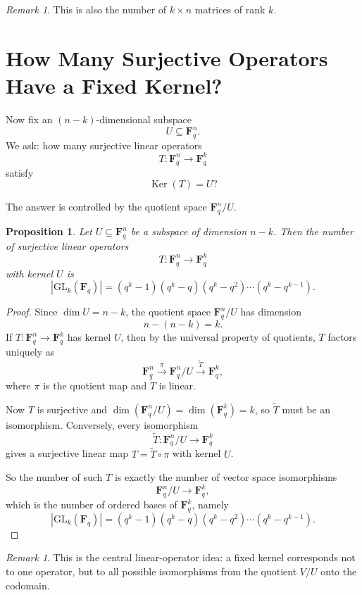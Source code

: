 \documentclass[11pt]{article}
\newtheorem{proposition}[theorem]{Proposition}
\theoremstyle{definition}
\theoremstyle{remark}
\newtheorem{remark}[theorem]{Remark}
\newcommand{\F}{\mathbf{F}}
\newcommand{\GL}{\mathrm{GL}}
\newcommand{\Ker}{\operatorname{Ker}}
\begin{document}
	\begin{remark}
		This is also the number of \(k\times n\) matrices of rank \(k\).
	\end{remark}
	
	\section{How Many Surjective Operators Have a Fixed Kernel?}
	
	Now fix an \((n-k)\)-dimensional subspace
	\[
	U\subseteq \F_q^n.
	\]
	We ask: how many surjective linear operators
	\[
	T:\F_q^n\to \F_q^k
	\]
	satisfy
	\[
	\Ker(T)=U?
	\]
	
	The answer is controlled by the quotient space \(\F_q^n/U\).
	
	\begin{proposition}
		Let \(U\subseteq \F_q^n\) be a subspace of dimension \(n-k\). Then the number of surjective linear operators
		\[
		T:\F_q^n\to \F_q^k
		\]
		with kernel \(U\) is
		\[
		|\GL_k(\F_q)|
		=
		(q^k-1)(q^k-q)(q^k-q^2)\cdots(q^k-q^{k-1}).
		\]
	\end{proposition}
	
	\begin{proof}
		Since \(\dim U=n-k\), the quotient space \(\F_q^n/U\) has dimension
		\[
		n-(n-k)=k.
		\]
		If \(T:\F_q^n\to \F_q^k\) has kernel \(U\), then by the universal property of quotients, \(T\) factors uniquely as
		\[
		\F_q^n \xrightarrow{\pi} \F_q^n/U \xrightarrow{\widetilde{T}} \F_q^k,
		\]
		where \(\pi\) is the quotient map and \(\widetilde{T}\) is linear.
		
		Now \(T\) is surjective and \(\dim(\F_q^n/U)=\dim(\F_q^k)=k\), so \(\widetilde{T}\) must be an isomorphism. Conversely, every isomorphism
		\[
		\widetilde{T}:\F_q^n/U\to \F_q^k
		\]
		gives a surjective linear map \(T=\widetilde{T}\circ\pi\) with kernel \(U\).
		
		So the number of such \(T\) is exactly the number of vector space isomorphisms
		\[
		\F_q^n/U\to \F_q^k,
		\]
		which is the number of ordered bases of \(\F_q^k\), namely
		\[
		|\GL_k(\F_q)|
		=
		(q^k-1)(q^k-q)(q^k-q^2)\cdots(q^k-q^{k-1}).
		\]
	\end{proof}
	
	\begin{remark}
		This is the central linear-operator idea: a fixed kernel corresponds not to one operator, but to all possible isomorphisms from the quotient \(V/U\) onto the codomain.
	\end{remark}
	
\end{document}
